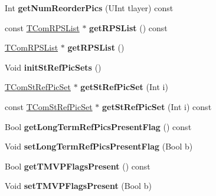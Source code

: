 \begin{DoxyCompactItemize}
\item 
\mbox{\label{class_t_com_s_p_s_a9e1c9d3bf172e6cb429747d9e08fe577}} 
Int {\bfseries get\+Num\+Reorder\+Pics} (U\+Int tlayer) const
\item 
\mbox{\label{class_t_com_s_p_s_a97bf5db999d432065dbcc36e7311140d}} 
const \hyperlink{class_t_com_r_p_s_list}{T\+Com\+R\+P\+S\+List} $\ast$ {\bfseries get\+R\+P\+S\+List} () const
\item 
\mbox{\label{class_t_com_s_p_s_a1a01966d7b069263814d68ea8868951f}} 
\hyperlink{class_t_com_r_p_s_list}{T\+Com\+R\+P\+S\+List} $\ast$ {\bfseries get\+R\+P\+S\+List} ()
\item 
\mbox{\label{class_t_com_s_p_s_a463c72b705c68f9bf894646fa999cf8b}} 
Void {\bfseries init\+St\+Ref\+Pic\+Sets} ()
\item 
\mbox{\label{class_t_com_s_p_s_a257f103c62df86f659d7ba4cbf1fb1e1}} 
\hyperlink{class_t_com_st_ref_pic_set}{T\+Com\+St\+Ref\+Pic\+Set} $\ast$ {\bfseries get\+St\+Ref\+Pic\+Set} (Int i)
\item 
\mbox{\label{class_t_com_s_p_s_a6c5c94c0a9ae443e629fb2deb3f87750}} 
const \hyperlink{class_t_com_st_ref_pic_set}{T\+Com\+St\+Ref\+Pic\+Set} $\ast$ {\bfseries get\+St\+Ref\+Pic\+Set} (Int i) const
\item 
\mbox{\label{class_t_com_s_p_s_a3636a5241bb7dfe74a72f9f141de6df6}} 
Bool {\bfseries get\+Long\+Term\+Ref\+Pics\+Present\+Flag} () const
\item 
\mbox{\label{class_t_com_s_p_s_a38111bcf8f522f40cdfb4f78b3e15503}} 
Void {\bfseries set\+Long\+Term\+Ref\+Pics\+Present\+Flag} (Bool b)
\item 
\mbox{\label{class_t_com_s_p_s_a2faf2cc153a7a260640a6eaa6e0e2748}} 
Bool {\bfseries get\+T\+M\+V\+P\+Flags\+Present} () const
\item 
\mbox{\label{class_t_com_s_p_s_a782174956a249ffe259c898568c2f21e}} 
Void {\bfseries set\+T\+M\+V\+P\+Flags\+Present} (Bool b)

\end{DoxyCompactItemize}
